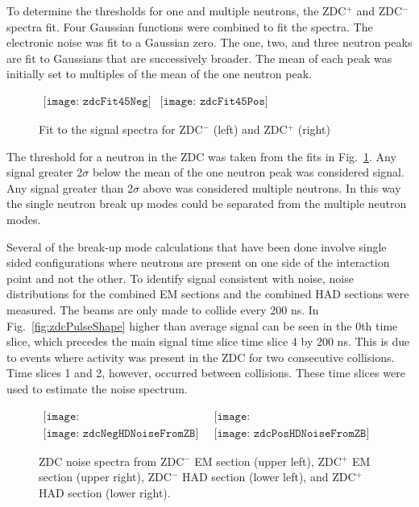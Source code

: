       To determine the thresholds for one and multiple neutrons, the ZDC$^{+}$ 
        and ZDC$^{-}$ spectra \DIFdelbegin {}\DIFdelend \DIFaddbegin {}\DIFaddend fit.
      Four Gaussian functions were combined to fit the spectra. 
      The electronic noise was fit to a Gaussian \DIFdelbegin {}\DIFdelend \DIFaddbegin {}\DIFaddend zero.
      The one, two, and three neutron peaks are fit to Gaussians that are 
        successively broader.
      The mean of each peak was initially set to multiples of the mean of the 
        one neutron peak. 
      \begin{figure}[!Hh]
        \centering
        $ 
          \begin{array}{cc}
            \texttt{[image: zdcFit45Neg]} &
            \texttt{[image: zdcFit45Pos]}
          \end{array} 
        $
        \caption{Fit to the signal spectra for ZDC$^{-}$ (left) and ZDC$^{+}$ 
          (right)}
        \label{fig:zdcM2Fit}
      \end{figure}
      The threshold for a neutron in the ZDC was taken from the fits in 
        Fig.~\ref{fig:zdcM2Fit}.
      Any signal greater 2$\sigma$ below the mean of the one neutron peak was 
        considered signal.
      Any signal greater than 2$\sigma$ above was considered multiple 
        neutrons.
      In this way the single neutron break up modes could be separated from the
        multiple neutron modes.

      Several of the break-up mode calculations that have been done involve
        single sided configurations where neutrons are present on one side
        of the interaction point and not the other.
      To identify signal consistent with noise, noise distributions for the 
        combined EM sections and the combined HAD sections were measured.
      The beams are only made to collide every 200 ns. 
      In Fig.~\ref{fig:zdcPulseShape} higher than average signal can be seen
        in the 0th time slice, which precedes the main signal time slice 
        time slice 4 by 200 ns. 
      This is due to events where activity was present in the ZDC for 
        two consecutive collisions.
      Time slices 1 and 2, however, occurred between collisions.
      These time slices were used to estimate the noise spectrum.
      \begin{figure}[!Hhbt]
        \centering
        $ \begin{array}{cc}
          \texttt{[image: zdcNegEMNoiseFromZBNoCor]} & 
          \texttt{[image: zdcPosEMNoiseFromZBNoCor]} \\
          \texttt{[image: zdcNegHDNoiseFromZB]} &
          \texttt{[image: zdcPosHDNoiseFromZB]}
        \end{array} $
        \caption{ZDC noise spectra from ZDC$^{-}$ EM section (upper left), 
          ZDC$^{+}$ EM section (upper right), ZDC$^{-}$ HAD section (lower left), 
          and ZDC$^{+}$ HAD section (lower right).}
        \label{fig:zdcNoiseSpectra}
      \end{figure}

